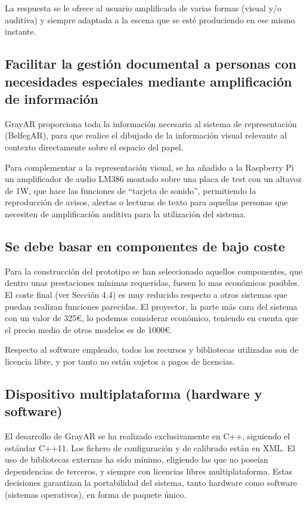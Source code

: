 La respuesta se le ofrece al usuario amplificada de varias formas (visual y/o auditiva) y siempre adaptada a la escena que se esté produciendo en ese mismo instante.

\subsection{Facilitar la gestión documental a personas con necesidades especiales mediante amplificación de información} 
GrayAR proporciona toda la información necesaria al sistema de representación (BelfegAR), para que realice el dibujado de la información visual relevante al contexto directamente sobre el espacio del papel.

Para complementar a la representación visual, se ha añadido a la Raspberry Pi un amplificador de audio LM386 montado sobre una placa de test con un altavoz de 1W, que hace las funciones de ``tarjeta de sonido'', permitiendo la reproducción de avisos, alertas o lecturas de texto para aquellas personas que necesiten de amplificación auditiva para la utilización del sistema.
  
\subsection{Se debe basar en componentes de bajo coste}
Para la construcción del prototipo se han seleccionado aquellos componentes, que dentro unas prestaciones mínimas requeridas, fuesen lo mas económicos posibles. El coste final (ver Sección 4.4) es muy reducido respecto a otros sistemas que puedan realizan funciones parecidas. El proyector, la parte más cara del sistema con un valor de 325\euro, lo podemos considerar económico, teniendo en cuenta que el precio medio de otros modelos es de 1000\euro.

Respecto al software empleado, todos los recursos y bibliotecas utilizadas son de licencia libre, y por tanto no están sujetos a pagos de licencias. 

\subsection{Dispositivo multiplataforma (hardware y software)}
El desarrollo de GrayAR se ha realizado exclusivamente en C++, siguiendo el estándar C++11. Los fichero de configuración y de calibrado están en XML. El uso de bibliotecas externas ha sido mínimo, eligiendo las que no poseían dependencias de terceros, y siempre con licencias libres multiplataforma. Estas decisiones garantizan la portabilidad del sistema, tanto hardware como software (sistemas operativos), en forma de paquete único.



